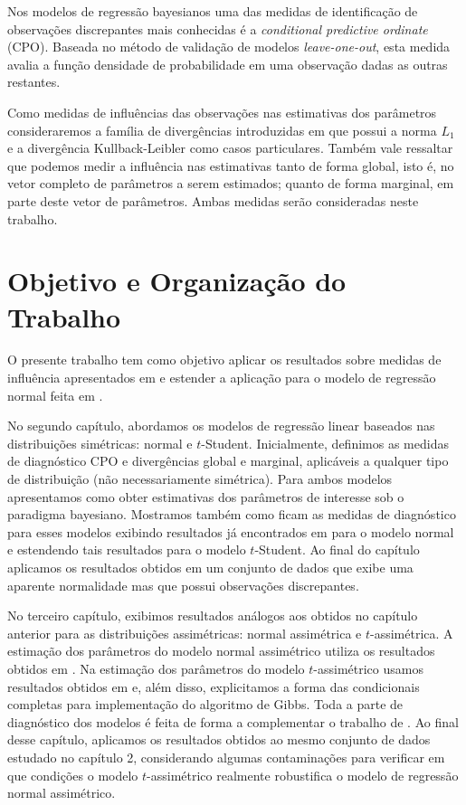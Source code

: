 Nos modelos de regressão bayesianos uma das medidas de identificação de observações discrepantes mais conhecidas é a \textit{conditional predictive ordinate} (CPO). Baseada no método de validação de modelos \textit{leave-one-out}, esta medida avalia a função densidade de probabilidade em uma observação dadas as outras restantes.

Como medidas de influências das observações nas estimativas dos parâmetros consideraremos a família de divergências introduzidas em \citet{Weiss1996} que possui a norma $L_1$ e a divergência Kullback-Leibler como casos particulares. Também vale ressaltar que podemos medir a influência nas estimativas tanto de forma global, isto é, no vetor completo de parâmetros a serem estimados; quanto de forma marginal, em parte deste vetor de parâmetros. Ambas medidas serão consideradas neste trabalho.

\section{Objetivo e Organização do Trabalho}
\label{sec:organizacao_trabalho}

O presente trabalho tem como objetivo aplicar os resultados sobre medidas de influência apresentados em \citet{Weiss1996} e estender a aplicação para o modelo de regressão normal feita em \citet{WeissCho1998}.

No segundo capítulo, abordamos os modelos de regressão linear baseados nas distribuições simétricas: normal e $t$-Student. Inicialmente, definimos as medidas de diagnóstico CPO e divergências global e marginal, aplicáveis a qualquer tipo de distribuição (não necessariamente simétrica). Para ambos modelos apresentamos como obter estimativas dos parâmetros de interesse sob o paradigma bayesiano. Mostramos também como ficam as medidas de diagnóstico para esses modelos exibindo resultados já encontrados em \citet{WeissCho1998} para o modelo normal e estendendo tais resultados para o modelo $t$-Student. Ao final do capítulo aplicamos os resultados obtidos em um conjunto de dados que exibe uma aparente normalidade mas que possui observações discrepantes.

No terceiro capítulo, exibimos resultados análogos aos obtidos no capítulo anterior para as distribuições assimétricas: normal assimétrica e $t$-assimétrica. A estimação dos parâmetros do modelo normal assimétrico utiliza os resultados obtidos em \citet{Bayes2005:MSc}. Na estimação dos parâmetros do modelo $t$-assimétrico usamos resultados obtidos em \citet{Godoi2007:MSc} e, além disso, explicitamos a forma das condicionais completas para implementação do algoritmo de Gibbs. Toda a parte de diagnóstico dos modelos é feita de forma a complementar o trabalho de \citet{WeissCho1998}. Ao final desse capítulo, aplicamos os resultados obtidos ao mesmo conjunto de dados estudado no capítulo 2, considerando algumas contaminações para verificar em que condições o modelo $t$-assimétrico realmente robustifica o modelo de regressão normal assimétrico.

